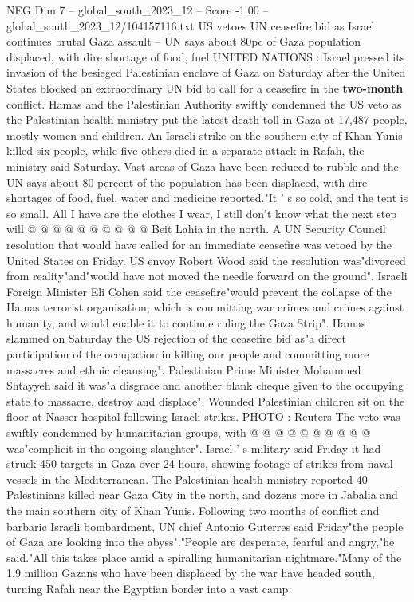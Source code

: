 \begin{textsample}{NEG Dim 7 – global\_south\_2023\_12 – Score -1.00 – global\_south\_2023\_12/104157116.txt}  \label{ex:f7_neg_194}
US vetoes UN ceasefire bid as Israel continues brutal Gaza assault -- UN says about 80pc of Gaza population displaced, with dire shortage of food, fuel UNITED NATIONS : Israel pressed its invasion of the besieged Palestinian enclave of Gaza on Saturday after the United States blocked an extraordinary UN bid to call for a ceasefire in the \textbf{two-month} conflict.
Hamas and the Palestinian Authority swiftly condemned the US veto as the Palestinian health ministry put the latest death toll in Gaza at 17,487 people, mostly women and children.
An Israeli strike on the southern city of Khan Yunis killed six people, while five others died in a separate attack in Rafah, the ministry said Saturday.
Vast areas of Gaza have been reduced to rubble and the UN says about 80 percent of the population has been displaced, with dire shortages of food, fuel, water and medicine reported."It ' s so cold, and the tent is so small.
All I have are the clothes I wear, I still don't know what the next step will @ @ @ @ @ @ @ @ @ @ Beit Lahia in the north.
A UN Security Council resolution that would have called for an immediate ceasefire was vetoed by the United States on Friday.
US envoy Robert Wood said the resolution was"divorced from reality"and"would have not moved the needle forward on the ground".
Israeli Foreign Minister Eli Cohen said the ceasefire"would prevent the collapse of the Hamas terrorist organisation, which is committing war crimes and crimes against humanity, and would enable it to continue ruling the Gaza Strip".
Hamas slammed on Saturday the US rejection of the ceasefire bid as"a direct participation of the occupation in killing our people and committing more massacres and ethnic cleansing".
Palestinian Prime Minister Mohammed Shtayyeh said it was"a disgrace and another blank cheque given to the occupying state to massacre, destroy and displace".
Wounded Palestinian children sit on the floor at Nasser hospital following Israeli strikes.
PHOTO : Reuters The veto was swiftly condemned by humanitarian groups, with @ @ @ @ @ @ @ @ @ @ was"complicit in the ongoing slaughter".
Israel ' s military said Friday it had struck 450 targets in Gaza over 24 hours, showing footage of strikes from naval vessels in the Mediterranean.
The Palestinian health ministry reported 40 Palestinians killed near Gaza City in the north, and dozens more in Jabalia and the main southern city of Khan Yunis.
Following two months of conflict and barbaric Israeli bombardment, UN chief Antonio Guterres said Friday"the people of Gaza are looking into the abyss"."People are desperate, fearful and angry,"he said."All this takes place amid a spiralling humanitarian nightmare."Many of the 1.9 million Gazans who have been displaced by the war have headed south, turning Rafah near the Egyptian border into a vast camp.

\end{textsample}
